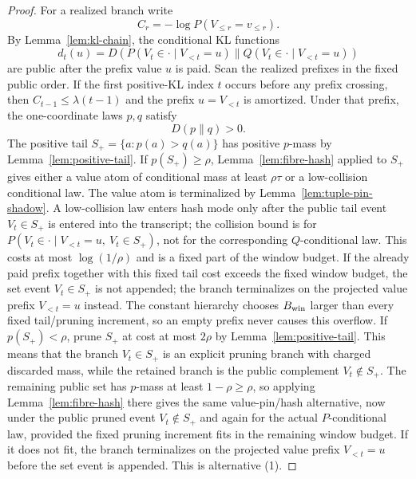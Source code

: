 \documentclass[11pt]{article}
\begin{document}
\begin{proof}
For a realized branch write
\[
  C_r=-\log P(V_{\le r}=v_{\le r}).
\]
By Lemma~\ref{lem:kl-chain}, the conditional KL functions
\[
  d_t(u)=D(P(V_t\in\cdot\mid V_{<t}=u)\|
          Q(V_t\in\cdot\mid V_{<t}=u))
\]
are public after the prefix value $u$ is paid.  Scan the realized prefixes in
the fixed public order.  If the first positive-KL index $t$ occurs before any
prefix crossing, then $C_{t-1}\le\lambda(t-1)$ and the prefix
$u=V_{<t}$ is amortized.  Under that prefix, the one-coordinate laws $p,q$
satisfy
\[
  D(p\|q)>0.
\]
The positive tail $S_+=\{a:p(a)>q(a)\}$ has positive $p$-mass by
Lemma~\ref{lem:positive-tail}.  If $p(S_+)\ge\rho$, Lemma~\ref{lem:fibre-hash}
applied to $S_+$ gives either a value atom of conditional mass at least
$\rho\tau$ or a low-collision conditional law.  The value atom is
terminalized by Lemma~\ref{lem:tuple-pin-shadow}.  A low-collision law enters
  hash mode only after the public tail event $V_t\in S_+$ is entered into the
  transcript; the collision bound is for
  $P(V_t\in\cdot\mid V_{<t}=u,\ V_t\in S_+)$, not for the corresponding
  $Q$-conditional law.  This costs at most $\log(1/\rho)$ and is a fixed part of
  the window budget.  If the already paid prefix together with this fixed tail
  cost exceeds the fixed window budget, the set event $V_t\in S_+$ is not
  appended; the branch terminalizes on the projected value prefix
  $V_{<t}=u$ instead.  The constant hierarchy chooses $B_{\rm win}$ larger than
  every fixed tail/pruning increment, so an empty prefix never causes this
  overflow.  If
$p(S_+)<\rho$, prune $S_+$ at cost at most $2\rho$ by
Lemma~\ref{lem:positive-tail}.  This means that the branch
$V_t\in S_+$ is an explicit pruning branch with charged discarded mass, while
the retained branch is the public complement $V_t\notin S_+$.  The remaining
public set has $p$-mass at least $1-\rho\ge\rho$, so applying
Lemma~\ref{lem:fibre-hash} there gives the same value-pin/hash alternative,
  now under the public pruned event $V_t\notin S_+$ and again for the actual
  $P$-conditional law, provided the fixed pruning increment fits in the
	  remaining window budget.  If it does not fit, the branch terminalizes on the
	  projected value prefix $V_{<t}=u$ before the set event is appended.  This is
	  alternative (1).


\end{proof}
\end{document}

